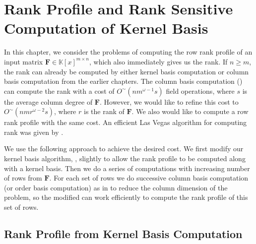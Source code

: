 
\chapter{\label{chap:rank}Rank Profile and Rank Sensitive Computation of
Kernel Basis}

In this chapter, we consider the problems of computing the row rank
profile of an input matrix $\mathbf{F}\in\mathbb{K}\left[x\right]^{m\times n}$,
which also immediately gives us the rank. If $n\ge m$, the rank can
already be computed by either kernel basis computation or column basis
computation from the earlier chapters. The column basis computation
() can compute the rank with a cost of $O^{\sim}(nm^{\omega-1}s)$
field operations, where $s$ is the average column degree of $\mathbf{F}$.
However, we would like to refine this cost to $O^{\sim}\left(nmr^{\omega-2}s\right)$,
where $r$ is the rank of $\mathbf{F}$. We also would like to compute
a row rank profile with the same cost. An efficient Las Vegas algorithm
for computing rank was given by \citet{storjohann-villard:2005}.

We use the following approach to achieve the desired cost. We first
modify our kernel basis algorithm, ,
slightly to allow the rank profile to be computed along with a kernel
basis. Then we do a series of computations with increasing number
of rows from $\mathbf{F}$. For each set of rows we do successive
column basis computation (or order basis computation) as in 
to reduce the column dimension of the problem, so the modified 
can work efficiently to compute the rank profile of this set of rows.


\section{Rank Profile from Kernel Basis Computation}


